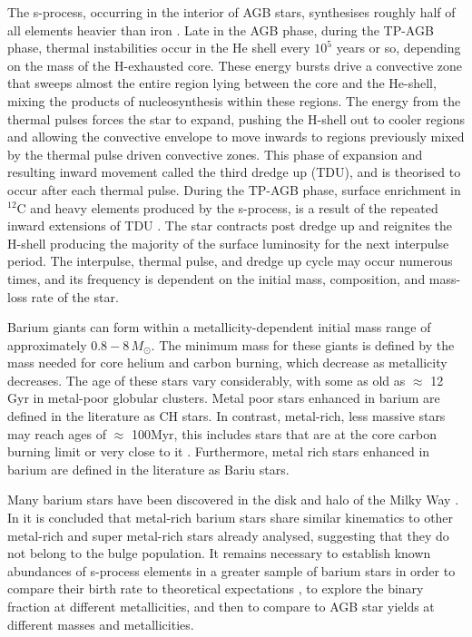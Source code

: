 \documentclass[a4paper,fleqn,usenatbib]{mnras}
\begin{document}
The s-process, occurring in the interior of AGB stars, synthesises roughly half of all elements heavier than iron \citep[e.g.,][]{busso1999,travaglio2001,herwig2005,bisterzo2014,karakas2014}. Late in the AGB phase, during the TP-AGB phase, thermal instabilities occur in the He shell every $10^5$ years or so, depending on the mass of the H-exhausted core. These energy bursts drive a convective zone that sweeps almost the entire region lying between the core and the He-shell, mixing the products of nucleosynthesis within these regions. The energy from the thermal pulses forces the star to expand, pushing the H-shell out to cooler regions and allowing the convective envelope to move inwards to regions previously mixed by the thermal pulse driven convective zones. This phase of expansion and resulting inward movement called the third dredge up (TDU), and is theorised to occur after each thermal pulse. During the TP-AGB phase, surface enrichment in $^{12}$C and heavy elements produced by the s-process, is a result of the repeated inward extensions of TDU \citep[e.g.,][]{busso2001}. The star contracts post dredge up and reignites the H-shell producing the majority of the surface luminosity for the next interpulse period. The interpulse, thermal pulse, and dredge up cycle may occur numerous times, and its frequency is dependent on the initial mass, composition, and mass-loss rate of the star.

Barium giants can form within a metallicity-dependent initial mass range of approximately $0.8 - 8\,M_{\odot}$. The minimum mass for these giants is defined by the mass needed for core helium and carbon burning, which decrease as metallicity decreases. The age of these stars vary considerably, with some as old as $\approx$ 12\,Gyr in metal-poor globular clusters. Metal poor stars enhanced in barium are defined in the literature as CH stars. In contrast, metal-rich, less massive stars may reach ages of $\approx$ 100Myr, this includes stars that are at the core carbon burning limit or very close to it \citep[e.g.,][]{whitelock2013}. Furthermore, metal rich stars enhanced in barium are defined in the literature as Bariu stars.

Many barium stars have been discovered in the disk and halo of the Milky Way \citep{gomez1997,mennessier1997}. In \citet{pereira2011} it is concluded that metal-rich barium stars share similar kinematics to other metal-rich and super metal-rich stars already analysed, suggesting that they do not belong to the bulge population. It remains necessary to establish known abundances of s-process elements in a greater sample of barium stars in order to compare their birth rate to theoretical expectations \citep{han1995}, to explore the binary fraction at different metallicities, and then to compare to AGB star yields at different masses and metallicities.
\end{document}
